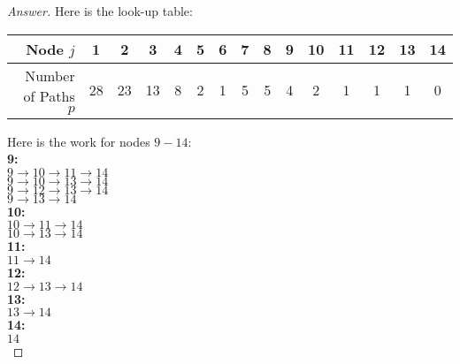 \documentclass[11pt]{article}
\theoremstyle{definition}
\theoremstyle{definition}
\theoremstyle{definition}
\begin{document}
\begin{proof}[Answer]
Here is the look-up table:\\

\begin{center}
\begin{tabular}{r|c|c|c|c|c|c|c|c|c|c|c|c|c|c}
	Node $j$  & 1  & 2 &3 &4 &5 &6 &7 &8 &9 &10 &11 &12 &13 &14\\
	\hline
	Number of Paths $p$ &28 & 23& 13&8 &2 &1 &5 &5 &4 &2 &1 &1 &1 &0 \\
	\hline
\end{tabular}
\end{center}

Here is the work for nodes $9 - 14$:\\
\textbf{9:}\\
$9 \to 10 \to 11 \to 14$\\
$9 \to 10 \to 13 \to 14$\\
$9 \to 12 \to 13 \to 14$\\
$9 \to 13 \to 14$\\

\noindent \textbf{10:}\\
$10 \to 11 \to 14$\\
$10 \to 13 \to 14$\\

\noindent \textbf{11:}\\
$11 \to 14$\\

\noindent \textbf{12:}\\
$12 \to 13 \to 14$\\

\noindent \textbf{13:}\\
$13 \to 14$\\

\noindent \textbf{14:}\\
$14$\\

\end{proof}




\newpage
\end{document}
